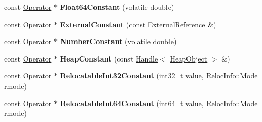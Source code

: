 \begin{DoxyCompactItemize}
\item 
const \hyperlink{classv8_1_1internal_1_1compiler_1_1_operator}{Operator} $\ast$ {\bfseries Float64\+Constant} (volatile double)\hypertarget{classv8_1_1internal_1_1compiler_1_1_common_operator_builder_af1bdc24b6ad2b59a86c47b478a1fb0bc}{}\label{classv8_1_1internal_1_1compiler_1_1_common_operator_builder_af1bdc24b6ad2b59a86c47b478a1fb0bc}

\item 
const \hyperlink{classv8_1_1internal_1_1compiler_1_1_operator}{Operator} $\ast$ {\bfseries External\+Constant} (const External\+Reference \&)\hypertarget{classv8_1_1internal_1_1compiler_1_1_common_operator_builder_a54211e83561acf817e6a0794c0682c7b}{}\label{classv8_1_1internal_1_1compiler_1_1_common_operator_builder_a54211e83561acf817e6a0794c0682c7b}

\item 
const \hyperlink{classv8_1_1internal_1_1compiler_1_1_operator}{Operator} $\ast$ {\bfseries Number\+Constant} (volatile double)\hypertarget{classv8_1_1internal_1_1compiler_1_1_common_operator_builder_aaacd2694a3a0d082521774081299762d}{}\label{classv8_1_1internal_1_1compiler_1_1_common_operator_builder_aaacd2694a3a0d082521774081299762d}

\item 
const \hyperlink{classv8_1_1internal_1_1compiler_1_1_operator}{Operator} $\ast$ {\bfseries Heap\+Constant} (const \hyperlink{classv8_1_1internal_1_1_handle}{Handle}$<$ \hyperlink{classv8_1_1internal_1_1_heap_object}{Heap\+Object} $>$ \&)\hypertarget{classv8_1_1internal_1_1compiler_1_1_common_operator_builder_ad6360434c1e95955a98fd440173593df}{}\label{classv8_1_1internal_1_1compiler_1_1_common_operator_builder_ad6360434c1e95955a98fd440173593df}

\item 
const \hyperlink{classv8_1_1internal_1_1compiler_1_1_operator}{Operator} $\ast$ {\bfseries Relocatable\+Int32\+Constant} (int32\+\_\+t value, Reloc\+Info\+::\+Mode rmode)\hypertarget{classv8_1_1internal_1_1compiler_1_1_common_operator_builder_a6eeef8332d414b2adbbc37af58d53fab}{}\label{classv8_1_1internal_1_1compiler_1_1_common_operator_builder_a6eeef8332d414b2adbbc37af58d53fab}

\item 
const \hyperlink{classv8_1_1internal_1_1compiler_1_1_operator}{Operator} $\ast$ {\bfseries Relocatable\+Int64\+Constant} (int64\+\_\+t value, Reloc\+Info\+::\+Mode rmode)\hypertarget{classv8_1_1internal_1_1compiler_1_1_common_operator_builder_a17a961b41118c0cf66f39e64f12f52b7}{}\label{classv8_1_1internal_1_1compiler_1_1_common_operator_builder_a17a961b41118c0cf66f39e64f12f52b7}


\end{DoxyCompactItemize}
